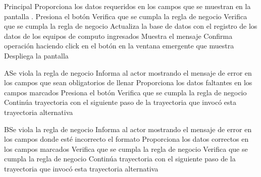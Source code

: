 
\begin{UCtrayectoria}{Principal}
		\UCpaso[\UCactor] Proporciona los datos requeridos en los campos que se muestran en la pantalla .
		\UCpaso[\UCactor] Presiona el botón  
		\UCpaso[\UCsist] Verifica que se cumpla la regla de negocio  
		\UCpaso[\UCsist] Verifica que se cumpla la regla de negocio  
		\UCpaso[\UCsist] Actualiza la base de datos con el registro de los datos de los equipos de computo ingresados 
		\UCpaso[\UCsist] Muestra el mensaje  
		\UCpaso[\UCactor] Confirma operación haciendo click en el botón  en la ventana emergente que muestra
		\UCpaso[\UCsist] Despliega la pantalla 
\end{UCtrayectoria}



\begin{UCtrayectoriaA}{A}{Se viola la regla de negocio }	
			\UCpaso[\UCsist] Informa al actor mostrando el mensaje de error  en los campos que sean obligatorios de llenar
			\UCpaso[\UCactor] Proporciona los datos faltantes en los campos marcados 
			\UCpaso[\UCactor] Presiona el botón   
			\UCpaso[\UCsist] Verifica que se cumpla la regla de negocio  
			\UCpaso[\UCsist] Continúa trayectoria con el siguiente paso de la trayectoria que invocó esta trayectoria alternativa
\end{UCtrayectoriaA}


\begin{UCtrayectoriaA}{B}{Se viola la regla de negocio }	
			\UCpaso[\UCsist] Informa al actor mostrando el mensaje de error  en los campos donde esté incorrecto el formato
			\UCpaso[\UCactor] Proporciona los datos correctos en los campos marcados
			\UCpaso[\UCsist] Verifica que se cumpla la regla de negocio  
		\UCpaso[\UCsist] Verifica que se cumpla la regla de negocio  
			\UCpaso[\UCsist] Continúa trayectoria con el siguiente paso de la trayectoria que invocó esta trayectoria alternativa
\end{UCtrayectoriaA}

